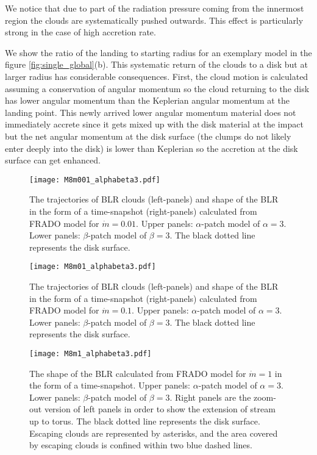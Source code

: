 \documentclass[twocolumn]{aastex62}
\begin{document}
We notice that due to part of the radiation pressure coming from the innermost region the clouds are systematically pushed outwards. This effect is particularly strong in the case of high accretion rate.

We show the ratio of the landing to starting radius for an exemplary model in the figure \ref{fig:single_global}(b). This systematic return of the clouds to a disk but at larger radius has considerable consequences. First, the cloud motion is calculated assuming a conservation of angular momentum so the cloud returning to the disk has lower angular momentum than the Keplerian angular momentum at the landing point.
This newly arrived lower angular momentum material does not immediately accrete since it gets mixed up with the disk material at the impact but the net angular momentum at the disk surface (the clumps do not likely enter deeply into the disk) is lower than Keplerian so the accretion at the disk surface can get enhanced.

\begin{figure*}[hbp]
	\centering
	\texttt{[image: M8m001\_alphabeta3.pdf]}
	\caption{The trajectories of BLR clouds (left-panels) and shape of the BLR  in the form of a time-snapshot (right-panels) calculated from FRADO model for $\dot m = 0.01$. Upper panels: $\alpha$-patch model of $\alpha =3$. Lower panels: $\beta$-patch model of $\beta =3$. The black dotted line represents the disk surface.}
	\label{fig:BLR_shape2}
\end{figure*}

\begin{figure*}[hbp]
	\centering
	\texttt{[image: M8m01\_alphabeta3.pdf]}
	\caption{The trajectories of BLR clouds (left-panels) and shape of the BLR  in the form of a time-snapshot (right-panels) calculated from FRADO model for $\dot m = 0.1$. Upper panels: $\alpha$-patch model of $\alpha =3$. Lower panels: $\beta$-patch model of $\beta =3$.  The black dotted line represents the disk surface.}
	\label{fig:BLR_shape3}
\end{figure*}

\begin{figure*}[hbp]
	\centering
	\texttt{[image: M8m1\_alphabeta3.pdf]}
	\caption{The shape of the BLR calculated from FRADO model for $\dot m = 1$ in the form of a time-snapshot. Upper panels: $\alpha$-patch model of $\alpha =3$. Lower panels: $\beta$-patch model of $\beta =3$. Right panels are the zoom-out version of left panels in order to show the extension of stream up to torus. The black dotted line represents the disk surface. Escaping clouds are represented by asterisks, and the area covered by escaping clouds is confined within two blue dashed lines.}
	\label{fig:BLR_shape1}
\end{figure*}
\end{document}
